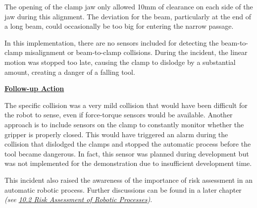 \documentclass[11pt]{book}
\begin{document}
The opening of the clamp jaw only allowed 10mm of clearance on each side of the jaw during this alignment. The deviation for the beam, particularly at the end of a long beam, could occasionally be too big for entering the narrow passage.

In this implementation, there are no sensors included for detecting the beam-to-clamp misalignment or beam-to-clamp collisions. During the incident, the linear motion was stopped too late, causing the clamp to dislodge by a substantial amount, creating a danger of a falling tool.

\textbf{\uline{Follow-up Action}}

The specific collision was a very mild collision that would have been difficult for the robot to sense, even if force-torque sensors would be available. Another approach is to include sensors on the clamp to constantly monitor whether the gripper is properly closed. This would have triggered an alarm during the collision that dislodged the clamps and stopped the automatic process before the tool became dangerous. In fact, this sensor was planned during development but was not implemented for the demonstration due to insufficient development time. 

This incident also raised the awareness of the importance of risk assessment in an automatic robotic process. Further discussions can be found in a later chapter \textit{(see \uline{10.2 Risk Assessment of Robotic Processes})}.
\end{document}
